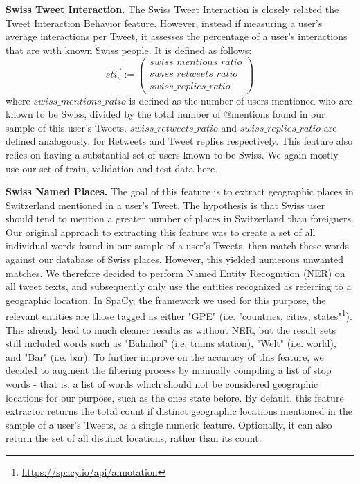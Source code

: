 \documentclass[10pt,a4paper]{article}
\begin{document}
\textbf{Swiss Tweet Interaction.} The Swiss Tweet Interaction is closely related the Tweet Interaction Behavior feature. However, instead if measuring a user's average interactions per Tweet, it assesses the percentage of a user's interactions that are with known Swiss people. It is defined as follows:
\begin{equation}
\overrightarrow{sti_u} := 
\begin{pmatrix}
swiss\_mentions\_ratio \\ swiss\_retweets\_ratio \\ swiss\_replies\_ratio
\end{pmatrix}
\end{equation}
where $swiss\_mentions\_ratio$ is defined as the number of users mentioned who are known to be Swiss, divided by the total number of @mentions found in our sample of this user's Tweets. $swiss\_retweets\_ratio$ and $swiss\_replies\_ratio$ are defined analogously, for Retweets and Tweet replies respectively. This feature also relies on having a substantial set of users known to be Swiss. We again mostly use our set of train, validation and test data here. 

\textbf{Swiss Named Places.} The goal of this feature is to extract geographic places in Switzerland mentioned in a user's Tweet. The hypothesis is that Swiss user should tend to mention a greater number of places in Switzerland than foreigners. Our original approach to extracting this feature was to create a set of all individual words found in our sample of a user's Tweets, then match these words against our database of Swiss places. However, this yielded numerous unwanted matches. We therefore decided to perform Named Entity Recognition (NER) on all tweet texts, and subsequently only use the entities recognized as referring to a geographic location. In SpaCy, the framework we used for this purpose, the relevant entities are those tagged as either  "GPE" (i.e. "countries, cities, states"\footnote{\href{https://spacy.io/api/annotation}{https://spacy.io/api/annotation}}). This already lead to much cleaner results as without NER, but the result sets still included words such as "Bahnhof" (i.e. trains station), "Welt" (i.e. world), and "Bar" (i.e. bar). To further improve on the accuracy of this feature, we decided to augment the filtering process by manually compiling a list of stop words - that is, a list of words which should not be considered geographic locations for our purpose, such as the ones state before. By default, this feature extractor returns the total count if distinct geographic locations mentioned in the sample of a user's Tweets, as a single numeric feature. Optionally, it can also return the set of all distinct locations, rather than its count.
\end{document}
